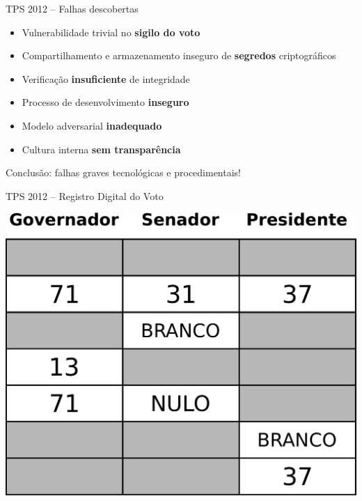 \documentclass[10pt]{beamer}
\begin{document}
\begin{frame}{TPS 2012 -- Falhas descobertas}

\begin{itemize}
\item Vulnerabilidade trivial no {\bf sigilo do voto}
\item Compartilhamento e armazenamento inseguro de {\bf segredos} criptográficos
\item Verificação {\bf insuficiente} de integridade
\item Processo de desenvolvimento {\bf inseguro}
\item Modelo adversarial {\bf inadequado}
\item Cultura interna {\bf sem transparência}
\end{itemize}

\bigskip
\alert{Conclusão}: falhas graves tecnológicas e procedimentais!
\end{frame}

\begin{frame}{TPS 2012 -- Registro Digital do Voto}
\begin{center}
\includegraphics[scale=0.35]{rdv4.pdf}
\end{center}
\end{frame}
\end{document}
